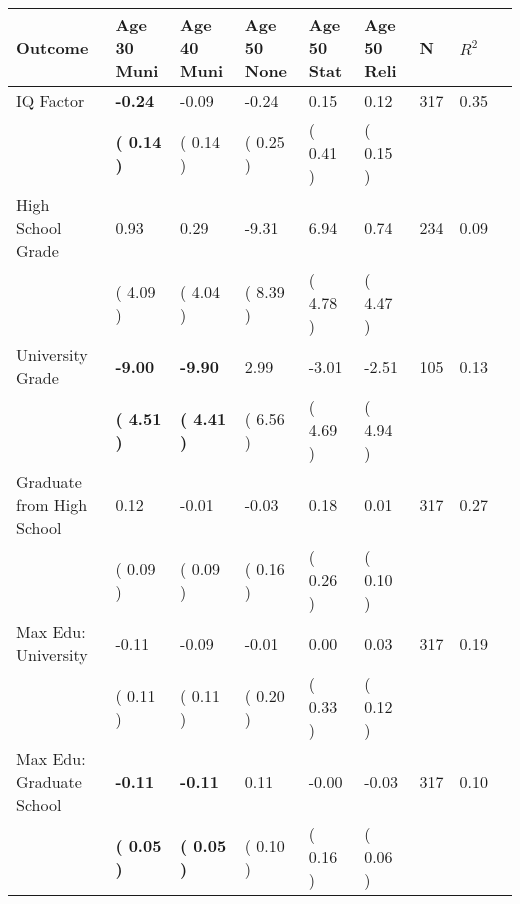 \begin{tabular}{L{6.2cm} C{1.8cm} C{1.8cm} C{1.8cm} C{1.8cm} C{1.8cm} C{1.8cm} C{0.3cm} C{0.3cm}}
\toprule
 \textbf{Outcome} & \textbf{Age 30 Muni} & \textbf{Age 40 Muni} & \textbf{Age 50 None} & \textbf{Age 50 Stat} & \textbf{Age 50 Reli} & \textbf{N} & \textbf{$ R^2$} \\
\midrule
IQ Factor & \textbf{    -0.24} &     -0.09 &     -0.24 &      0.15 &      0.12  & 317 &       0.35 \\ 
 & \textbf{(     0.14 )} & (     0.14 ) & (     0.25 ) & (     0.41 ) & (     0.15 )  & \\
High School Grade &      0.93 &      0.29 &     -9.31 &      6.94 &      0.74  & 234 &       0.09 \\ 
 & (     4.09 ) & (     4.04 ) & (     8.39 ) & (     4.78 ) & (     4.47 )  & \\
University Grade & \textbf{    -9.00} & \textbf{    -9.90} &      2.99 &     -3.01 &     -2.51  & 105 &       0.13 \\ 
 & \textbf{(     4.51 )} & \textbf{(     4.41 )} & (     6.56 ) & (     4.69 ) & (     4.94 )  & \\
Graduate from High School &      0.12 &     -0.01 &     -0.03 &      0.18 &      0.01  & 317 &       0.27 \\ 
 & (     0.09 ) & (     0.09 ) & (     0.16 ) & (     0.26 ) & (     0.10 )  & \\
Max Edu: University &     -0.11 &     -0.09 &     -0.01 &      0.00 &      0.03  & 317 &       0.19 \\ 
 & (     0.11 ) & (     0.11 ) & (     0.20 ) & (     0.33 ) & (     0.12 )  & \\
Max Edu: Graduate School & \textbf{    -0.11} & \textbf{    -0.11} &      0.11 &     -0.00 &     -0.03  & 317 &       0.10 \\ 
 & \textbf{(     0.05 )} & \textbf{(     0.05 )} & (     0.10 ) & (     0.16 ) & (     0.06 )  & \\
\bottomrule
\end{tabular}
